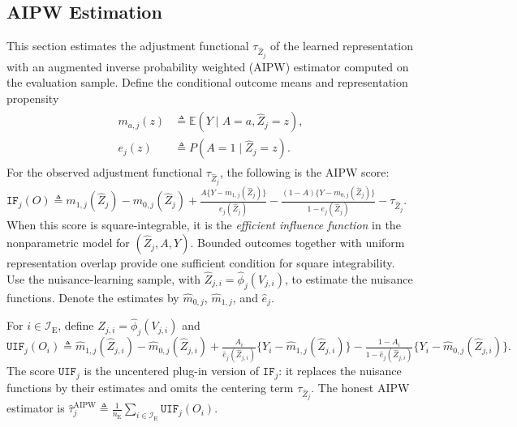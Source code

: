 \subsection{AIPW Estimation}
\label{sec:aipw-estimation}
This section estimates the adjustment functional $\tau_{\widehat Z_j}$ of the learned representation with an augmented inverse probability weighted (AIPW) estimator \citep{robins1994estimation,tsiatis2006semiparametric} computed on the evaluation sample.
 Define the conditional outcome means and representation propensity
\begin{align}
\begin{aligned}
	m_{a,j}(z) &\triangleq \mathbb E(Y\mid A=a,\widehat Z_j=z),\\
	e_j(z) &\triangleq P(A=1\mid\widehat Z_j=z).
\end{aligned}
\label{eq:aipw-nuisances}
\end{align}
For the observed adjustment functional $\tau_{\widehat Z_j}$, the following is the AIPW score:
\(\mathtt{IF}_j(O) \triangleq m_{1,j}(\widehat Z_j)-m_{0,j}(\widehat Z_j) + \frac{A\{Y-m_{1,j}(\widehat Z_j)\}}{e_j(\widehat Z_j)} - \frac{(1-A)\{Y-m_{0,j}(\widehat Z_j)\}}{1-e_j(\widehat Z_j)} - \tau_{\widehat Z_j}.\)
When this score is square-integrable, it is the \textit{efficient influence function} in the nonparametric model for $(\widehat Z_j,A,Y)$. Bounded outcomes together with uniform representation overlap provide one sufficient condition for square integrability. Use the nuisance-learning sample, with $\widehat Z_{j,i}=\widehat\phi_j(V_{j,i})$, to estimate the nuisance functions. Denote the estimates by $\widehat m_{0,j}$, $\widehat m_{1,j}$, and $\widehat e_j$.

\begin{definition}
\label{appdetail:def:honest-aipw}
\normalfont
For $i\in\mathcal I_{\mathrm E}$, define $\widehat Z_{j,i}=\widehat\phi_j(V_{j,i})$ and
	\(\mathtt{UIF}_j(O_i) \triangleq{} \widehat m_{1,j}(\widehat Z_{j,i}) - \widehat m_{0,j}(\widehat Z_{j,i}) + \frac{A_i}{\widehat e_j(\widehat Z_{j,i})} \{Y_i-\widehat m_{1,j}(\widehat Z_{j,i})\} - \frac{1-A_i}{1-\widehat e_j(\widehat Z_{j,i})} \{Y_i-\widehat m_{0,j}(\widehat Z_{j,i})\}.\)
The score $\mathtt{UIF}_j$ is the uncentered plug-in version of $\mathtt{IF}_j$: it replaces the nuisance functions by their estimates and omits the centering term $\tau_{\widehat Z_j}$.
The honest AIPW estimator is
\(\widehat\tau_j^{\mathrm{AIPW}} \triangleq \frac{1}{n_{\mathrm E}} \sum_{i\in\mathcal I_{\mathrm E}}\mathtt{UIF}_j(O_i).\)
\end{definition}

